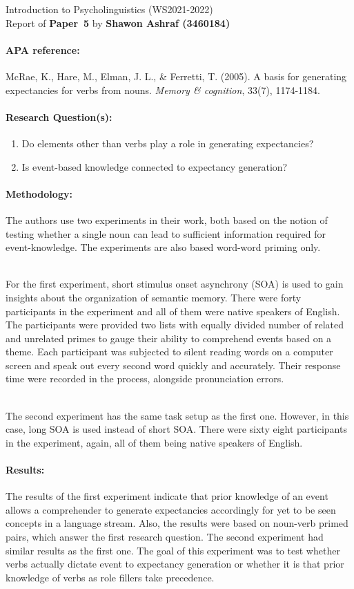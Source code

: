\documentclass[12pt]{report}
\newcommand{\student}[3]{\begin{tcolorbox}\noindent Introduction to
    Psycholinguistics (WS2021-2022) \\ Report of \textbf{Paper~#3} by
    \textbf{#1 (#2)} 
  \end{tcolorbox}}
\begin{document}
\student{Shawon Ashraf}{3460184}{5}


\paragraph{APA reference:} 
McRae, K., Hare, M., Elman, J. L., & Ferretti, T. (2005). A basis for generating expectancies for verbs from nouns. \textit{Memory & cognition}, 33(7), 1174-1184.


\paragraph{Research Question(s):}
\begin{enumerate}
    \item Do elements other than verbs play a role in generating expectancies?
    \item Is event-based knowledge connected to expectancy generation?
\end{enumerate}
\vfill
\paragraph{Methodology:} 
The authors use two experiments in their work, both based on the notion of testing whether a single noun can lead to sufficient information required for event-knowledge. The experiments are also based word-word priming only.


\noindent
\\ For the first experiment, short stimulus onset asynchrony (SOA) is used to gain insights about the organization of semantic memory. There were forty participants in the experiment and all of them were native speakers of English. The participants were provided two lists with equally divided number of related and unrelated primes to gauge their ability to comprehend events based on a theme. Each participant was subjected to silent reading words on a computer screen and speak out every second word quickly and accurately. Their response time were recorded in the process, alongside pronunciation errors. 

\noindent
\\ The second experiment has the same task setup as the first one. However, in this case, long SOA is used instead of short SOA. There were sixty eight participants in the experiment, again, all of them being native speakers of English.


\vfill

\paragraph{Results:} 
The results of the first experiment indicate that prior knowledge of an event allows a comprehender to generate expectancies accordingly for yet to be seen concepts in a language stream. Also, the results were based on noun-verb primed pairs, which answer the first research question. The second experiment had similar results as the first one. The goal of this experiment was to test whether verbs actually dictate event to expectancy generation or whether it is that prior knowledge of verbs as role fillers take precedence. 
\end{document}

